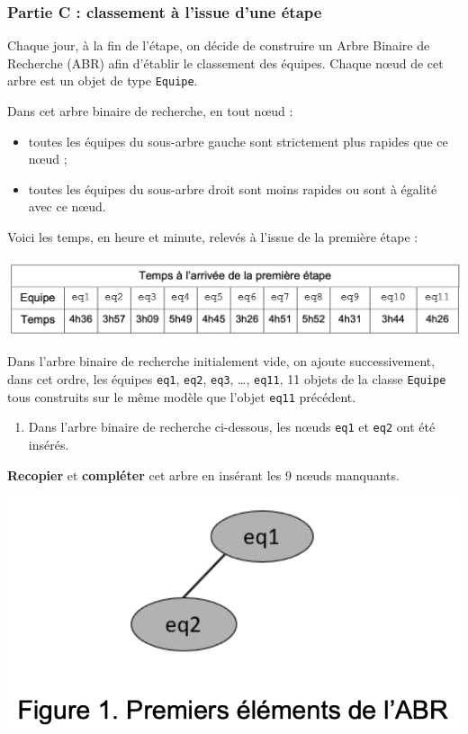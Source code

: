 \documentclass[
  paper=a4,
  ,captions=tableheading
]{scrartcl}
\providecommand{\tightlist}{%
  \setlength{\itemsep}{0pt}\setlength{\parskip}{0pt}}
\begin{document}
\subsubsection{Partie C : classement à l'issue d'une
étape}\label{partie-c-classement-uxe0-lissue-dune-uxe9tape}

Chaque jour, à la fin de l'étape, on décide de construire un Arbre
Binaire de Recherche (ABR) afin d'établir le classement des équipes.
Chaque nœud de cet arbre est un objet de type \texttt{Equipe}.

Dans cet arbre binaire de recherche, en tout nœud :

\begin{itemize}
\tightlist
\item
  toutes les équipes du sous-arbre gauche sont strictement plus rapides
  que ce nœud ;
\item
  toutes les équipes du sous-arbre droit sont moins rapides ou sont à
  égalité avec ce nœud.
\end{itemize}

Voici les temps, en heure et minute, relevés à l'issue de la première
étape :

\includegraphics{24-NSIJ1ME1-Ex3-02.png}

Dans l'arbre binaire de recherche initialement vide, on ajoute
successivement, dans cet ordre, les équipes \texttt{eq1}, \texttt{eq2},
\texttt{eq3}, \ldots, \texttt{eq11}, 11 objets de la classe
\texttt{Equipe} tous construits sur le même modèle que l'objet
\texttt{eq11} précédent.

\begin{enumerate}
\def\labelenumi{\arabic{enumi}.}
\setcounter{enumi}{7}
\tightlist
\item
  Dans l'arbre binaire de recherche ci-dessous, les nœuds \texttt{eq1}
  et \texttt{eq2} ont été insérés.
\end{enumerate}

\textbf{Recopier} et \textbf{compléter} cet arbre en insérant les 9
nœuds manquants.

\includegraphics{24-NSIJ1ME1-Ex3-03.png}
\end{document}
